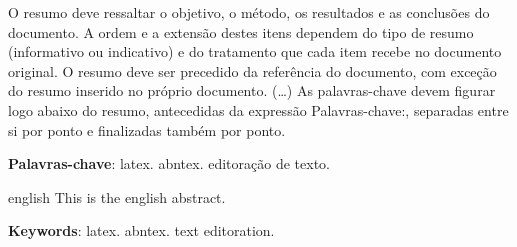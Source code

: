 \setlength{\absparsep}{18pt} %
\begin{resumo}
 O resumo deve ressaltar o
 objetivo, o método, os resultados e as conclusões do documento. A ordem e a extensão
 destes itens dependem do tipo de resumo (informativo ou indicativo) e do
 tratamento que cada item recebe no documento original. O resumo deve ser
 precedido da referência do documento, com exceção do resumo inserido no
 próprio documento. (\ldots) As palavras-chave devem figurar logo abaixo do
 resumo, antecedidas da expressão Palavras-chave:, separadas entre si por
 ponto e finalizadas também por ponto.

 \textbf{Palavras-chave}: latex. abntex. editoração de texto.
\end{resumo}

\begin{resumo}[Abstract]
 \begin{otherlanguage*}{english}
   This is the english abstract.

   \vspace{\onelineskip}

   \noindent
   \textbf{Keywords}: latex. abntex. text editoration.
 \end{otherlanguage*}
\end{resumo}

%
%
%

